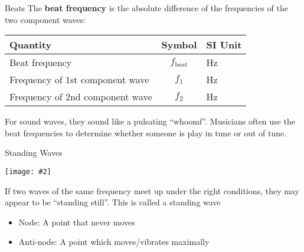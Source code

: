\documentclass[12pt,aspectratio=169]{beamer}
\newcommand{\pic}[2]{\texttt{[image: \#2]}}
\newcommand{\eq}[2]{\vspace{#1}{\Large\begin{displaymath}#2\end{displaymath}}}
\begin{document}
\begin{frame}{Beats}
  The \textbf{beat frequency} is the absolute difference of the frequencies of
  the two component waves:

  \eq{-.2in}{
    \boxed{f_\mathrm{beat}=|f_1-f_2|}
  }
  \begin{center}
    \begin{tabular}{l|c|l}
      \rowcolor{pink}
      \textbf{Quantity} & \textbf{Symbol} & \textbf{SI Unit} \\ \hline
      Beat frequency     & $f_\mathrm{beat}$   & \si{\hertz} \\
      Frequency of 1st component wave & $f_1$ & \si{\hertz} \\
      Frequency of 2nd component wave & $f_2$ & \si{\hertz}
    \end{tabular}
  \end{center}
  For sound waves, they sound like a pulsating ``whoomf''. Musicians often use
  the beat frequencies to determine whether someone is play in tune or out of
  tune.
\end{frame}



\begin{frame}{Standing Waves}
  \begin{center}
    \pic{.6}{standing-wave-3.png}
  \end{center}
  If two waves of the same frequency meet up under the right conditions, they
  may appear to be ``standing still''. This is called a standing wave
  \begin{itemize}
  \item Node: A point that never moves
  \item Anti-node: A point which moves/vibrates maximally
  \end{itemize}
\end{frame}
\end{document}
